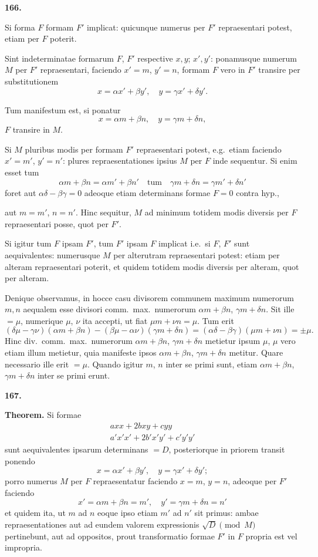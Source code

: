 \documentclass[12pt,a4paper]{article}
\theoremstyle{plain}
\begin{document}
\bigskip

\textbf{166.}

Si forma $F$ formam $F'$ implicat: quicunque numerus per $F'$ repraesentari potest, etiam per $F$ poterit.

Sint indeterminatae formarum $F$, $F'$ respective $x,y$; $x',y'$: ponamusque numerum $M$ per $F'$ repraesentari, faciendo $x'=m$, $y'=n$, formam $F$ vero in $F'$ transire per substitutionem
\[
x = \alpha x' + \beta y', \quad y = \gamma x' + \delta y'.
\]

Tum manifestum est, si ponatur
\[
x = \alpha m + \beta n, \quad y = \gamma m + \delta n,
\]
$F$ transire in $M$.

Si $M$ pluribus modis per formam $F'$ repraesentari potest, e.g.~etiam faciendo $x'=m'$, $y'=n'$: plures repraesentationes ipsius $M$ per $F$ inde sequentur. Si enim esset tum
\[
\alpha m + \beta n = \alpha m' + \beta n' \quad \text{tum} \quad \gamma m + \delta n = \gamma m' + \delta n'
\]
foret aut $\alpha\delta - \beta\gamma = 0$ adeoque etiam determinans formae $F = 0$ contra hyp.,

aut $m = m'$, $n = n'$. Hinc sequitur, $M$ ad minimum totidem modis diversis per $F$ repraesentari posse, quot per $F'$.

Si igitur tum $F$ ipsam $F'$, tum $F'$ ipsam $F$ implicat i.e.~si $F$, $F'$ sunt aequivalentes: numerusque $M$ per alterutram repraesentari potest: etiam per alteram repraesentari poterit, et quidem totidem modis diversis per alteram, quot per alteram.

Denique observamus, in hocce casu divisorem communem maximum numerorum $m,n$ aequalem esse divisori comm.~max.~numerorum $\alpha m + \beta n$, $\gamma m + \delta n$. Sit ille $= \mu$, numerique $\mu$, $\nu$ ita accepti, ut fiat $\mu m + \nu n = \mu$. Tum erit
\[
(\delta\mu - \gamma\nu)(\alpha m + \beta n) - (\beta\mu - \alpha\nu)(\gamma m + \delta n) = (\alpha\delta - \beta\gamma)(\mu m + \nu n) = \pm \mu.
\]
Hinc div.~comm.~max.~numerorum $\alpha m + \beta n$, $\gamma m + \delta n$ metietur ipsum $\mu$, $\mu$ vero etiam illum metietur, quia manifeste ipsos $\alpha m + \beta n$, $\gamma m + \delta n$ metitur. Quare necessario ille erit $= \mu$. Quando igitur $m$, $n$ inter se primi sunt, etiam $\alpha m + \beta n$, $\gamma m + \delta n$ inter se primi erunt.

\bigskip

\textbf{167.}

\textbf{Theorem.} Si formae
\begin{align*}
axx + 2bxy + cyy \tag{$F$}\\
a'x'x' + 2b'x'y' + c'y'y' \tag{$F'$}
\end{align*}
sunt aequivalentes ipsarum determinans $= D$, posteriorque in priorem transit ponendo
\[
x = \alpha x' + \beta y', \quad y = \gamma x' + \delta y';
\]
porro numerus $M$ per $F$ repraesentatur faciendo $x = m$, $y = n$, adeoque per $F'$ faciendo
\[
x' = \alpha m + \beta n = m', \quad y' = \gamma m + \delta n = n'
\]
et quidem ita, ut $m$ ad $n$ eoque ipso etiam $m'$ ad $n'$ sit primus: ambae repraesentationes aut ad eundem valorem expressionis $\sqrt{D} \pmod{M}$ pertinebunt, aut ad oppositos, prout transformatio formae $F'$ in $F$ propria est vel impropria.
\end{document}
